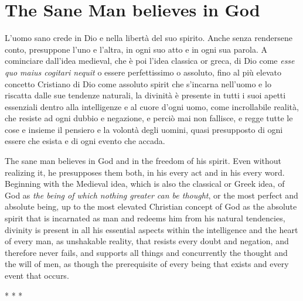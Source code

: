 \section{The Sane Man believes in God}

\begin{quotex}
L'uomo sano crede in Dio e nella libertà del suo spirito. Anche senza rendersene conto, presuppone l'uno e l'altra, in ogni suo atto e in ogni sua parola. A cominciare dall'idea medieval, che è poi l'idea classica or greca, di Dio come \emph{esse quo maius cogitari nequit} o essere perfettissimo o assoluto, fino al più elevato concetto Cristiano di Dio come assoluto spirit che s'incarna nell'uomo e lo riscatta dalle sue tendenze naturali, la divinità è presente in tutti i suoi apetti essenziali dentro alla intelligenze e al cuore d'ogni uomo, come incrollabile realità, che resiste ad ogni dubbio e negazione, e perciò mai non fallisce, e regge tutte le cose e insieme il pensiero e la volontà degli uomini, quasi presupposto di ogni essere che esista e di ogni evento che accada.\\
\end{quotex}


The sane man believes in God and in the freedom of his spirit. Even without realizing it, he presupposes them both, in his every act and in his every word. Beginning with the Medieval idea, which is also the classical or Greek idea, of God as \emph{the being of which nothing greater can be thought}, or the most perfect and absolute being, up to the most elevated Christian concept of God as the absolute spirit that is incarnated as man and redeems him from his natural tendencies, divinity is present in all his essential aspects within the intelligence and the heart of every man, as unshakable reality, that resists every doubt and negation, and therefore never fails, and supports all things and concurrently the thought and the will of men, as though the prerequisite of every being that exists and every event that occurs.



\begin{center}* * *\end{center}

